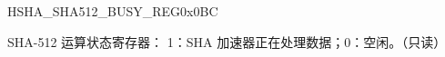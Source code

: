 \begin{register}{H}{SHA\_SHA512\_BUSY\_REG}{0x0BC}\label{regdesc:SHASHA512BUSYREG}
%
%
\regnewline%
\begin{regdesc}\begin{reglist}
\item [SHA\_SHA512\_BUSY] SHA-512 运算状态寄存器： 1：SHA 加速器正在处理数据；0：空闲。（只读）
\end{reglist}\end{regdesc}
\end{register}




